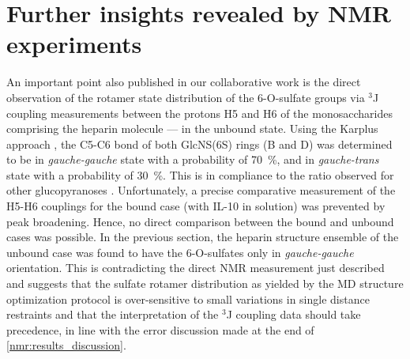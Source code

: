 
\section{Further insights revealed by NMR experiments}
\label{nmr:further_insights}

An important point also published in our collaborative work
\cite{kuenze_gehrcke_2014} is the direct observation of the rotamer state
distribution of the 6-O-sulfate groups via ${}^{3}$J coupling measurements
between the protons H5 and H6 of the monosaccharides comprising the heparin
molecule --- in the unbound state. Using the Karplus approach
\cite{haasnoot_karplus_1980,nishida_rotameric_nmr_1988}, the C5-C6 bond of both
GlcNS(6S) rings (B and D) was determined to be in \textit{gauche-gauche} state
with a probability of \SI{70}{\percent}, and in  \textit{gauche-trans} state
with a probability of \SI{30}{\percent}. This is in compliance to the ratio
observed for other glucopyranoses \cite{nishida_rotameric_nmr_1988}.
Unfortunately, a precise comparative measurement of the H5-H6 couplings for the
bound case (with IL-10 in solution) was prevented by peak broadening. Hence, no
direct comparison between the bound and unbound cases was possible. In the
previous section, the heparin structure ensemble of the unbound case was found
to have the 6-O-sulfates only in \textit{gauche-gauche} orientation. This is
contradicting the direct NMR measurement just described and suggests that the
sulfate rotamer distribution as yielded by the MD structure optimization
protocol is over-sensitive to small variations in single distance restraints and
that the interpretation of the ${}^{3}$J coupling data should take precedence,
in line with the error discussion made at the end of
\cref{nmr:results_discussion}.

